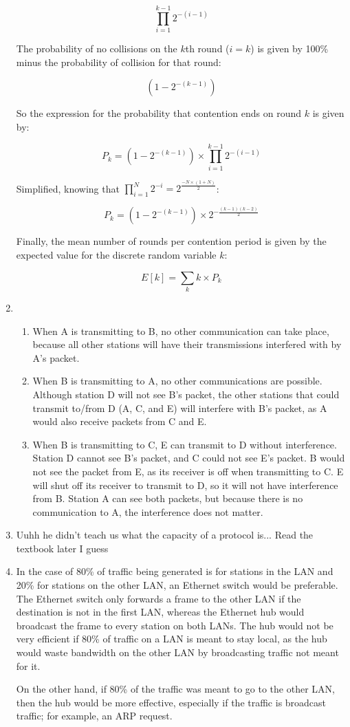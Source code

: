 \documentclass{article}
\begin{document}
\begin{enumerate}
$$ \prod_{i=1}^{k-1}2^{-(i-1)} $$

The probability of no collisions on the $ k $th round ($ i = k $) is given by 100\% minus the probability of collision for that round:

$$ (1-2^{-(k-1)}) $$

So the expression for the probability that contention ends on round $ k $ is given by:

$$ P_k = (1-2^{-(k-1)}) \times \prod_{i=1}^{k-1}2^{-(i-1)} $$

Simplified, knowing that $ \prod_{i=1}^{N}2^{-i} = 2^{\frac{-N \times (1 + N)}{2}}$:

$$ P_k = (1-2^{-(k-1)}) \times 2^{-\frac{(k-1)(k-2)}{2}} $$

Finally, the mean number of rounds per contention period is given by the expected value for the discrete random variable $ k $:

$$ E[k] = \sum_{k}k \times P_k $$

\item
\begin{enumerate}

\item When A is transmitting to B, no other communication can take place, because all other stations will have their transmissions interfered with by A's packet.

\item When B is transmitting to A, no other communications are possible. Although station D will not see B's packet, the other stations that could transmit to/from D (A, C, and E) will interfere with B's packet, as A would also receive packets from C and E.

\item When B is transmitting to C, E can transmit to D without interference. Station D cannot see B's packet, and C could not see E's packet. B would not see the packet from E, as its receiver is off when transmitting to C. E will shut off its receiver to transmit to D, so it will not have interference from B. Station A can see both packets, but because there is no communication to A, the interference does not matter.

\end{enumerate}

\item Uuhh he didn't teach us what the capacity of a protocol is... Read the textbook later I guess

\item In the case of 80\% of traffic being generated is for stations in the LAN and 20\% for stations on the other LAN, an Ethernet switch would be preferable. The Ethernet switch only forwards a frame to the other LAN if the destination is not in the first LAN, whereas the Ethernet hub would broadcast the frame to every station on both LANs. The hub would not be very efficient if 80\% of traffic on a LAN is meant to stay local, as the hub would waste bandwidth on the other LAN by broadcasting traffic not meant for it.

On the other hand, if 80\% of the traffic was meant to go to the other LAN, then the hub would be more effective, especially if the traffic is broadcast traffic; for example, an ARP request.

\end{enumerate}
\end{document}
